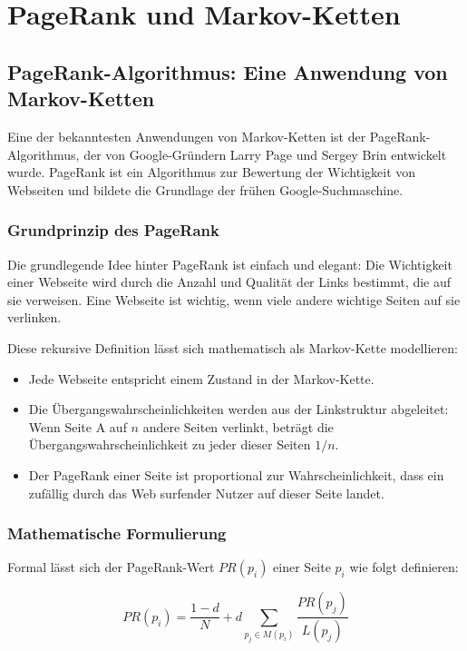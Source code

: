 \chapter{PageRank und Markov-Ketten}
\label{ch:pagerank-markov}

\section{PageRank-Algorithmus: Eine Anwendung von Markov-Ketten}

Eine der bekanntesten Anwendungen von Markov-Ketten ist der PageRank-Algorithmus, der von Google-Gründern Larry Page und Sergey Brin entwickelt wurde. PageRank ist ein Algorithmus zur Bewertung der Wichtigkeit von Webseiten und bildete die Grundlage der frühen Google-Suchmaschine.

\subsection{Grundprinzip des PageRank}

Die grundlegende Idee hinter PageRank ist einfach und elegant: Die Wichtigkeit einer Webseite wird durch die Anzahl und Qualität der Links bestimmt, die auf sie verweisen. Eine Webseite ist wichtig, wenn viele andere wichtige Seiten auf sie verlinken.

Diese rekursive Definition lässt sich mathematisch als Markov-Kette modellieren:

\begin{itemize}
    \item Jede Webseite entspricht einem Zustand in der Markov-Kette.
    \item Die Übergangswahrscheinlichkeiten werden aus der Linkstruktur abgeleitet: Wenn Seite A auf $n$ andere Seiten verlinkt, beträgt die Übergangswahrscheinlichkeit zu jeder dieser Seiten $1/n$.
    \item Der PageRank einer Seite ist proportional zur Wahrscheinlichkeit, dass ein zufällig durch das Web surfender Nutzer auf dieser Seite landet.
\end{itemize}

\subsection{Mathematische Formulierung}

Formal lässt sich der PageRank-Wert $PR(p_i)$ einer Seite $p_i$ wie folgt definieren:

\[
    PR(p_i) = \frac{1-d}{N} + d \sum_{p_j \in M(p_i)} \frac{PR(p_j)}{L(p_j)}
\]

